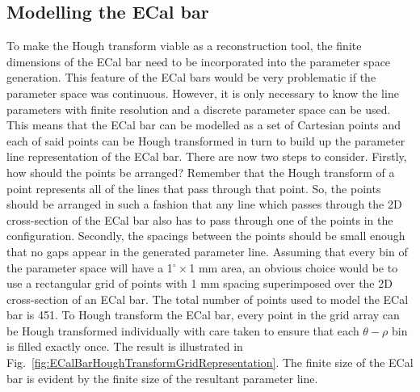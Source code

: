\subsection{Modelling the ECal bar}
\label{subsec:ECalBarModel}
To make the Hough transform viable as a reconstruction tool, the finite dimensions of the ECal bar need to be incorporated into the parameter space generation.  This feature of the ECal bars would be very problematic if the parameter space was continuous.  However, it is only necessary to know the line parameters with finite resolution and a discrete parameter space can be used.  This means that the ECal bar can be modelled as a set of Cartesian points and each of said points can be Hough transformed in turn to build up the parameter line representation of the ECal bar.
\newline
\newline
There are now two steps to consider.  Firstly, how should the points be arranged?  Remember that the Hough transform of a point represents all of the lines that pass through that point.  So, the points should be arranged in such a fashion that any line which passes through the 2D cross-section of the ECal bar also has to pass through one of the points in the configuration.  Secondly, the spacings between the points should be small enough that no gaps appear in the generated parameter line.  
\newline
\newline
Assuming that every bin of the parameter space will have a 1$^\circ\times$1 mm area, an obvious choice would be to use a rectangular grid of points with 1 mm spacing superimposed over the 2D cross-section of an ECal bar.  The total number of points used to model the ECal bar is 451.  To Hough transform the ECal bar, every point in the grid array can be Hough transformed individually with care taken to ensure that each $\theta-\rho$ bin is filled exactly once.  The result is illustrated in Fig.~\ref{fig:ECalBarHoughTransformGridRepresentation}.  The finite size of the ECal bar is evident by the finite size of the resultant parameter line.
